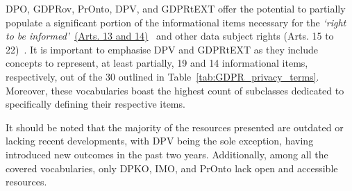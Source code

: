 DPO, GDPRov, PrOnto, DPV, and GDPRtEXT offer the potential to partially populate a significant portion of the informational items necessary for the \textit{`right to be informed'}~\hyperref[art:13-14]{(Arts. 13 and 14)}~\citeyearpar{noauthor_regulation_2016} and other data subject rights (Arts. 15 to 22)~\citeyearpar{noauthor_regulation_2016}.
It is important to emphasise DPV and GDPRtEXT as they include concepts to represent, at least partially, 19 and 14 informational items, respectively, out of the 30 outlined in Table~\ref{tab:GDPR_privacy_terms}.
Moreover, these vocabularies boast the highest count of subclasses dedicated to specifically defining their respective items.

It should be noted that the majority of the resources presented are outdated or lacking recent developments, with DPV being the sole exception, having introduced new outcomes in the past two years.
Additionally, among all the covered vocabularies, only DPKO, IMO, and PrOnto lack open and accessible resources.